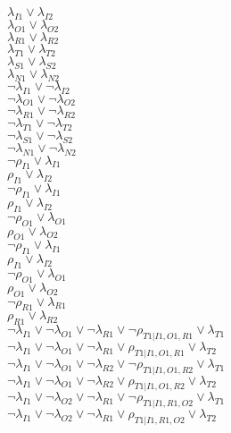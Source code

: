 $\lambda_{I1} \vee \lambda_{I2}$\\
$\lambda_{O1} \vee \lambda_{O2}$\\
$\lambda_{R1} \vee \lambda_{R2}$\\
$\lambda_{T1} \vee \lambda_{T2}$\\
$\lambda_{S1} \vee \lambda_{S2}$\\
$\lambda_{N1} \vee \lambda_{N2}$\\
$\neg\lambda_{I1} \vee \neg\lambda_{I2}$\\
$\neg\lambda_{O1} \vee \neg\lambda_{O2}$\\
$\neg\lambda_{R1} \vee \neg\lambda_{R2}$\\
$\neg\lambda_{T1} \vee \neg\lambda_{T2}$\\
$\neg\lambda_{S1} \vee \neg\lambda_{S2}$\\
$\neg\lambda_{N1} \vee \neg\lambda_{N2}$\\
$\neg\rho_{I1} \vee \lambda_{I1}$\\
$\rho_{I1} \vee \lambda_{I2}$\\
$\neg\rho_{I1} \vee \lambda_{I1}$\\
$\rho_{I1} \vee \lambda_{I2}$\\
$\neg\rho_{O1} \vee \lambda_{O1}$\\
$\rho_{O1} \vee \lambda_{O2}$\\
$\neg\rho_{I1} \vee \lambda_{I1}$\\
$\rho_{I1} \vee \lambda_{I2}$\\
$\neg\rho_{O1} \vee \lambda_{O1}$\\
$\rho_{O1} \vee \lambda_{O2}$\\
$\neg\rho_{R1} \vee \lambda_{R1}$\\
$\rho_{R1} \vee \lambda_{R2}$\\
$\neg\lambda_{I1} \vee \neg\lambda_{O1} \vee \neg\lambda_{R1} \vee \neg\rho_{T1|I1,O1,R1} \vee \lambda_{T1}$\\
$\neg\lambda_{I1} \vee \neg\lambda_{O1} \vee \neg\lambda_{R1} \vee \rho_{T1|I1,O1,R1} \vee \lambda_{T2}$\\
$\neg\lambda_{I1} \vee \neg\lambda_{O1} \vee \neg\lambda_{R2} \vee \neg\rho_{T1|I1,O1,R2} \vee \lambda_{T1}$\\
$\neg\lambda_{I1} \vee \neg\lambda_{O1} \vee \neg\lambda_{R2} \vee \rho_{T1|I1,O1,R2} \vee \lambda_{T2}$\\
$\neg\lambda_{I1} \vee \neg\lambda_{O2} \vee \neg\lambda_{R1} \vee \neg\rho_{T1|I1,R1,O2} \vee \lambda_{T1}$\\
$\neg\lambda_{I1} \vee \neg\lambda_{O2} \vee \neg\lambda_{R1} \vee \rho_{T1|I1,R1,O2} \vee \lambda_{T2}$\\
